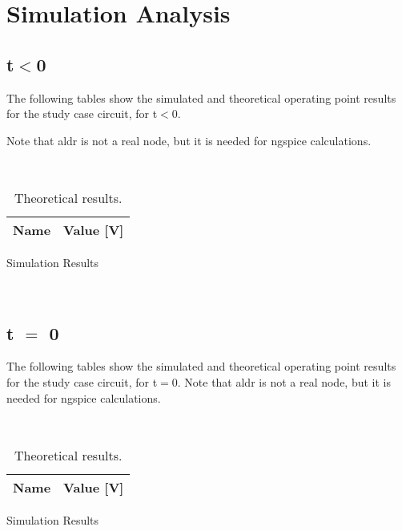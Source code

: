 \section{Simulation Analysis}
\label{sec:simulation analysis}
\subsection{t$<$0}

The following tables show the simulated and theoretical operating point results for the study case circuit, for t$<$0.

Note that aldr is not a real node, but it is needed for ngspice calculations.

\vspace{0.5cm}
\begin{table}[!htb]
    \begin{minipage}{0.50\textwidth}~
        \centering
        \begin{tabular}{|l|r|}
        {\bf Name} & {\bf Value [V]} \\ \hline
        
      \end{tabular}
      \caption{Simulation Results}
     \end{minipage}%
     \begin{minipage}{0.50\textwidth}~
       \centering
       \vspace{0.62cm}
       \caption{Theoretical results.}
     \end{minipage}
     \label{tab:t0}
\end{table}

\subsection{t $=$ 0}
\label{sec:3.2}

The following tables show the simulated and theoretical operating point results for the study case circuit, for t$=$0. Note that aldr is not a real node, but it is needed for ngspice calculations.


\begin{table}[!htb]
    \begin{minipage}{0.50\textwidth}~
        \centering
        \begin{tabular}{|l|r|}
        {\bf Name} & {\bf Value [V]} \\ \hline
        
      \end{tabular}
      \caption{Simulation Results}
     \end{minipage}%
     \begin{minipage}{0.50\textwidth}~
       \centering
       \vspace{0.62cm}
       \caption{Theoretical results.}
     \end{minipage}
     \label{tab:t0}
\end{table}


